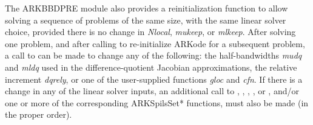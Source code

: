 \documentclass[letterpaper,10pt,english]{sphinxmanual}
\begin{document}
The ARKBBDPRE module also provides a reinitialization function to
allow solving a sequence of problems of the same size, with the same
linear solver choice, provided there is no change in \emph{Nlocal},
\emph{mukeep}, or \emph{mlkeep}. After solving one problem, and after
calling {\hyperref[c_interface/User_callable:c.ARKodeReInit]{\emph{}}} to re-initialize ARKode for a
subsequent problem, a call to {\hyperref[c_interface/Preconditioners:c.ARKBBDPrecReInit]{\emph{}}} can be made
to change any of the following: the half-bandwidths \emph{mudq} and
\emph{mldq} used in the difference-quotient Jacobian approximations, the
relative increment \emph{dqrely}, or one of the user-supplied functions
\emph{gloc} and \emph{cfn}. If there is a change in any of the linear solver
inputs, an additional call to {\hyperref[c_interface/User_callable:c.ARKSpgmr]{\emph{}}},
{\hyperref[c_interface/User_callable:c.ARKSpbcg]{\emph{}}}, {\hyperref[c_interface/User_callable:c.ARKSptfqmr]{\emph{}}}, {\hyperref[c_interface/User_callable:c.ARKSpfgmr]{\emph{}}},
or {\hyperref[c_interface/User_callable:c.ARKPcg]{\emph{}}}, and/or one or more of the corresponding
ARKSpilsSet* functions, must also be made (in the proper order).
\end{document}
